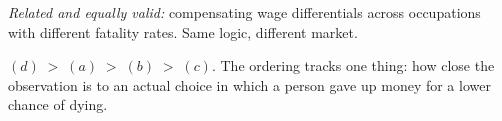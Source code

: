 \documentclass[12pt, letterpaper]{article}
\begin{document}
\begin{tcolorbox}[oddbox,title={Problem 2.5 \quad Measuring the Value of Life Expectancy}]
\begin{enumerate}
\emph{Related and equally valid:} compensating wage differentials across occupations with
different fatality rates. Same logic, different market.

\end{enumerate}

\begin{tcolorbox}[theorybox,title={Ranking}]
$(d) \;>\; (a) \;>\; (b) \;>\; (c)$. The ordering tracks one thing: how close the observation
is to an actual choice in which a person gave up money for a lower chance of dying.
\end{tcolorbox}
\end{tcolorbox}

\end{document}
